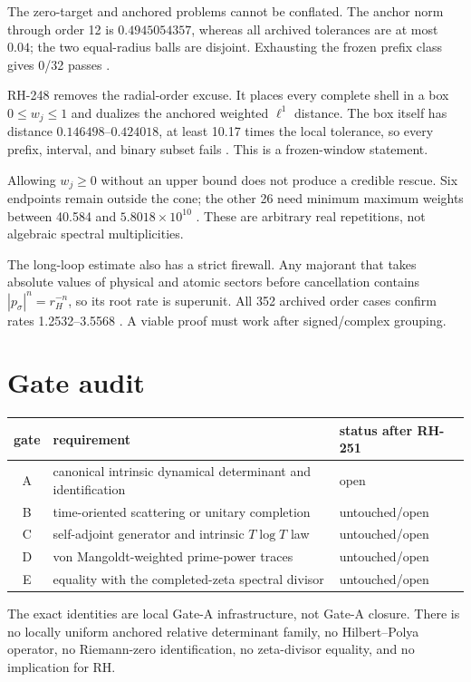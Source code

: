 \documentclass[11pt]{article}
\begin{document}
The zero-target and anchored problems cannot be conflated.  The anchor norm
through order 12 is $0.4945054357$, whereas all archived tolerances are at
most $0.04$; the two equal-radius balls are disjoint.  Exhausting the frozen
prefix class gives 0/32 passes \citep{WangRH244}.

RH-248 removes the radial-order excuse.  It places every complete shell in a
box $0\le w_j\le1$ and dualizes the anchored weighted $\ell^1$ distance.  The
box itself has distance $0.146498$--$0.424018$, at least 10.17 times the local
tolerance, so every prefix, interval, and binary subset fails
\citep{WangRH248}.  This is a frozen-window statement.

Allowing $w_j\ge0$ without an upper bound does not produce a credible rescue.
Six endpoints remain outside the cone; the other 26 need minimum maximum
weights between 40.584 and $5.8018\times10^{10}$ \citep{WangRH249}.  These are
arbitrary real repetitions, not algebraic spectral multiplicities.

The long-loop estimate also has a strict firewall.  Any majorant that takes
absolute values of physical and atomic sectors before cancellation contains
$|p_\sigma|^n=r_H^{-n}$, so its root rate is superunit.  All 352 archived
order cases confirm rates 1.2532--3.5568 \citep{WangRH247}.  A viable proof
must work after signed/complex grouping.

\section{Gate audit}

\begin{center}
\begin{tabular}{cll}
\toprule
gate & requirement & status after RH-251\\
\midrule
A & canonical intrinsic dynamical determinant and identification & open\\
B & time-oriented scattering or unitary completion & untouched/open\\
C & self-adjoint generator and intrinsic $T\log T$ law & untouched/open\\
D & von Mangoldt-weighted prime-power traces & untouched/open\\
E & equality with the completed-zeta spectral divisor & untouched/open\\
\bottomrule
\end{tabular}
\end{center}

The exact identities are local Gate-A infrastructure, not Gate-A closure.
There is no locally uniform anchored relative determinant family, no
Hilbert--Polya operator, no Riemann-zero identification, no zeta-divisor
equality, and no implication for RH.
\end{document}
